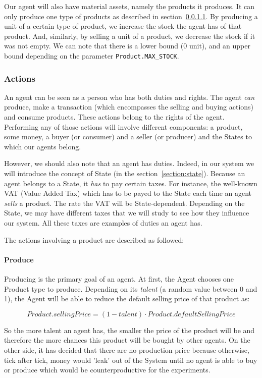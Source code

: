     Our agent will also have material assets, namely the products it produces. It can only produce one type of products as described in section~\ref{section:produce}. By producing a unit of a certain type of product, we increase the stock the agent has of that product. And, similarly, by selling a unit of a product, we decrease the stock if it was not empty. We can note that there is a lower bound (0 unit), and an upper bound depending on the parameter \texttt{Product.MAX\_STOCK}.


    \subsubsection{Actions}\label{section:actions}
    An agent can be seen as a person who has both duties and rights. The agent \emph{can} produce, make a transaction (which encompasses the selling and buying actions) and consume products. These actions belong to the rights of the agent. Performing any of those actions will involve different components: a product, some money, a buyer (or consumer) and a seller (or producer) and the States to which our agents belong. 

    However, we should also note that an agent has duties. Indeed, in our system we will introduce the concept of State (in the section~\ref{section:state}). Because an agent belongs to a State, it \emph{has} to pay certain taxes. 
    For instance, the well-known VAT (Value Added Tax) which has to be payed to the State each time an agent \emph{sells} a product. The rate the VAT will be State-dependent. Depending on the State, we may have different taxes that we will study to see how they influence our system. All these taxes are examples of duties an agent has. 

    The actions involving a product are described as followed:

    \paragraph{Produce}\label{section:produce}
    Producing is the primary goal of an agent. At first, the Agent chooses one Product type to produce. Depending on its \emph{talent} (a random value between 0 and 1), the Agent will be able to reduce the default selling price of that product as: 

    $$Product.sellingPrice = (1-talent) \cdot Product.defaultSellingPrice$$

    So the more talent an agent has, the smaller the price of the product will be and therefore the more chances this product will be bought by other agents. On the other side, it has decided that there are no production price because otherwise, tick after tick, money would 'leak' out of the System until no agent is able to buy or produce which would be counterproductive for the experiments.

